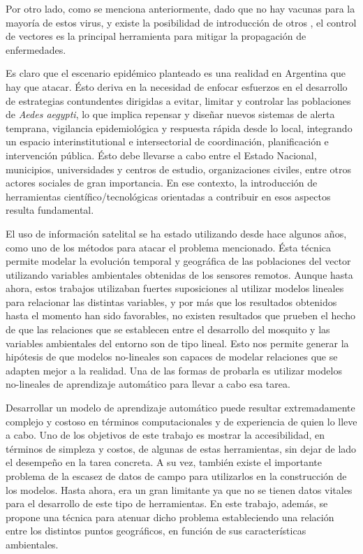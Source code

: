   \par Por otro lado, como se menciona anteriormente, dado que no hay vacunas para la
    mayoría de estos virus, y existe la posibilidad de introducción de otros \cite{emergencia_viral},
    el control de vectores es la principal herramienta para mitigar la
    propagación de enfermedades.


  \par Es claro que el escenario epidémico planteado es una realidad en Argentina
    que hay que atacar. Ésto deriva en la necesidad de enfocar esfuerzos en el
    desarrollo de estrategias contundentes dirigidas a evitar, limitar y controlar
    las poblaciones de \textit{Aedes aegypti}, lo que implica repensar y diseñar
    nuevos sistemas de alerta temprana, vigilancia epidemiológica y respuesta
    rápida desde lo local, integrando un espacio interinstitutional e
    intersectorial de coordinación, planificación e intervención pública. Ésto debe
    llevarse a cabo entre el Estado Nacional, municipios, universidades y centros
    de estudio, organizaciones civiles, entre otros actores sociales de gran importancia.
    En ese contexto, la introducción de herramientas científico/tecnológicas orientadas
    a contribuir en esos aspectos resulta fundamental.

  \par El uso de información satelital se ha estado utilizando desde hace
    algunos años, como uno de los métodos para atacar el problema mencionado.
    Ésta técnica permite modelar la evolución temporal y geográfica de las
    poblaciones del vector utilizando variables ambientales obtenidas de los
    sensores remotos. Aunque hasta ahora, estos trabajos utilizaban fuertes suposiciones
    al utilizar modelos lineales para relacionar las distintas variables, y por más
    que los resultados obtenidos hasta el momento han sido
    favorables, no existen resultados que prueben el hecho de que las
    relaciones que se establecen entre el desarrollo
    del mosquito y las variables ambientales del entorno son de tipo lineal.
    Esto nos permite generar la hipótesis de que modelos no-lineales son
    capaces de modelar relaciones que se adapten mejor a la realidad.
    Una de las formas de probarla es utilizar modelos no-lineales de
    aprendizaje automático para llevar a cabo esa tarea.


  \par Desarrollar un modelo de aprendizaje automático puede resultar extremadamente
    complejo y costoso en términos computacionales y de experiencia de quien lo lleve
    a cabo. Uno de los objetivos de este trabajo es mostrar la accesibilidad,
    en términos de simpleza y costos, de algunas de estas herramientas, sin dejar
    de lado el desempeño en la tarea concreta. A su vez, también existe el importante problema
    de la escasez de datos de campo para utilizarlos en la construcción de los modelos.
    Hasta ahora, era un gran limitante ya que no se tienen datos vitales
    para el desarrollo de este tipo de herramientas. En este trabajo, además, se
    propone una técnica para atenuar dicho problema estableciendo una relación
    entre los distintos puntos geográficos, en función de sus características ambientales.

